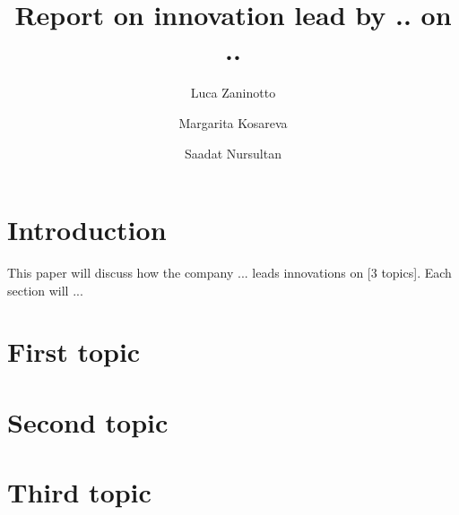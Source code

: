 \documentclass[12pt,oneside]{book}
\title{Report on innovation lead by .. on ..}
\author{
  Luca Zaninotto
  \and
  Margarita Kosareva
  \and
  Saadat Nursultan
}
\begin{document}
\maketitle

\chapter*{Introduction}
  This paper will discuss how the company ... leads innovations on
  [3 topics]. Each section will ...
  
\chapter{First topic}






\chapter{Second topic}






\chapter{Third topic}






\printbibliography
\end{document}
